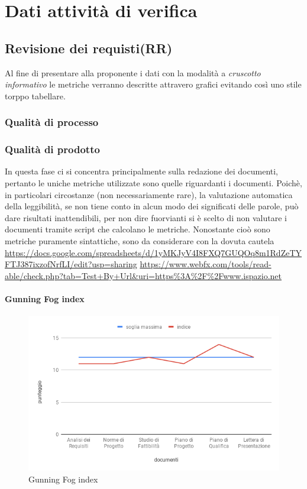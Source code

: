 \section{Dati attività di verifica}
\subsection{Revisione dei requisti(RR)}
Al fine di presentare alla proponente i dati con la modalità a \textit{cruscotto informativo} le metriche verranno descritte attravero grafici evitando così uno stile torppo tabellare.
\subsubsection{Qualità di processo}
\subsubsection{Qualità di prodotto}
In questa fase ci si concentra principalmente sulla redazione dei documenti, pertanto le uniche metriche utilizzate sono quelle riguardanti i documenti.
Poichè, in particolari circostanze (non necessariamente rare), la valutazione automatica della leggibilità, se non tiene conto in alcun modo dei significati delle parole, può dare risultati inattendibili, per non dire fuorvianti si è scelto di non valutare i documenti tramite script che calcolano le metriche.
Nonostante cioò sono metriche puramente sintattiche, sono da considerare con la dovuta cautela
\url{https://docs.google.com/spreadsheets/d/1yMKJyV4I8FXQ7GUQOq8m1RdZeTYFTJ387ixzofNrfLI/edit?usp=sharing}
\url{https://www.webfx.com/tools/read-able/check.php?tab=Test+By+Url&uri=https%3A%2F%2Fwww.ispazio.net}
	
\paragraph{Gunning Fog index}
\begin{figure}[h]
	\centering
	\includegraphics[width=\textwidth]{GunningFogIndex.png}
	\caption{Gunning Fog index}
	\hfill
\end{figure}

